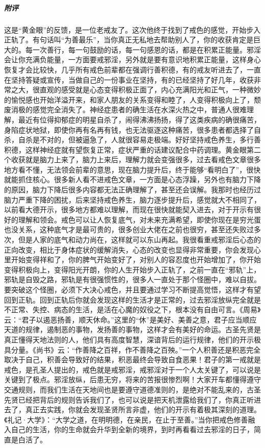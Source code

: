 \begin{case}
    \subparagraph{附评} 这是“黄金眼”的反馈，是一位老戒友了。这次他终于找到了戒色的感觉，开始步入正轨了。有句话叫“为善最乐”，当你真正无私地去帮助别人了，你的收获肯定是巨大的。每一次善行，每一句鼓励的话，每一句感恩的话，都是在积累正能量。邪淫会让你充满负能量，一方面要戒邪淫，另外就是要有意识地积累正能量，这样身心恢复才会比较快，几乎所有戒色前辈都在强调行善积德，有的戒友听进去了，一直在坚持答疑或宣传，当做自己的一份事业在坚持，有的已经坚持了好几年，收获非常之大，很直观的感受就是心态变得积极正面了，内心充满阳光和正气，一种微妙的愉悦感也开始洋溢开来，和家人朋友的关系变得和睦了，人变得积极向上了，颓废消极的感觉完全消失了。神经症患者的确生活在水深火热之中，普通人很难理解，最近有位得抑郁症的明星自杀了，闹得沸沸扬扬，得了这类疾病的确很痛苦，身陷症状地狱，即使你再有名再有钱，也无法驱逐这种痛苦，很多患者都选择了自杀，自杀是不对的，但被逼急了，人就很容易走极端。好好坚持戒色养生，多行善积德，这样神经症就有望恢复正常，症状严重的话建议配合中药调理。黄金眼第二个收获就是脑力上来了，脑力上来后，理解力就会变强很多，过去看戒色文章很多地方看不懂，无法领会前辈的意思，现在脑力提升后，终于能够“看明白了”，很快就能抓住核心。很多新人看不进戒色文章，一方面是心态浮躁，另外也有脑力下降的原因，脑力下降后很多内容都无法正确理解了，甚至还会误解。我那时也经历过脑力严重下降的困扰，后来坚持戒色养生，脑力逐步提升后，感觉就大不相同了，以前看大德开示，很多地方都难以理解，而现在很快就能契入进去，对于开示有很好的理解和领会。戒色可以让人恢复底气，对未来充满希望，即使你现在是穷光蛋也没关系，这种底气才是最可贵的，很多创业大佬在之前也很穷，甚至还失败过多次，但是人家的底气和动力尚在，这样就可以东山再起。我很看重戒邪淫后心态的正向改变，相比于身体症状的缓解消失，心态的改变也显得非常重要，你会发现心里开始变得祥和了，你的脾气开始变好了，对别人的容忍度也开始增加了，你开始变得积极向上，变得阳光开朗，你的人生开始步入正轨了，之前一直在“邪轨”上，邪轨是自毁之路，邪轨是有很强惯性的，很多人一直处于那个怪圈中，难以自拔。要突破这个怪圈，必须下大决心戒色，并且要通过学习不断提高觉悟，这样才有望回到正轨。回到正轨后你就会发现这样的生活才是正常的，过去邪淫放纵完全就是不正常、失控、病态的生活，是活在心魔的奴役之下，根本没有自由可言。《周易》云：“君子以遏恶扬善，顺天休命。”这里的“休”是美好、美善之意，君子应当顺应天道的规律，遏制恶的事物，发扬善的事物，这样才会有美好的命运。古圣先贤是真正懂得天地法则的人，他们具有高度智慧，深谙背后的运行规律，他们的开示极具分量。《尚书》云：“作善降之百祥，作不善降之百殃。”一个人积善还是积恶完全取决于自己，积善会导致好的结果，积恶最终会导致自食恶果！君子的第一戒就是戒色，是孔圣人提出的，戒色就是戒邪淫，戒邪淫对于一个人太关键了，可以说是关键到了极点。邪淫放纵，后患无穷，将来的苦报很惨烈啊！大家开车都懂得遵守交通规则，而我们生活在天地间也是要遵守道德准则的，是绝对不能乱来的，古圣先贤已经把背后的规则告诉我们了，也可以说是把天机泄露给我们了，你真正听进去了，真正去实践，你就会发现圣贤所言非虚，他们的开示有着极其深刻的道理。《礼记·大学》：“大学之道，在明明德，在亲民，在止于至善。”当你把戒色修善融入自己的生活，你的生命就会升华到全新的境界，到时再看看过去邪淫的日子，简直是白活了。
\end{case}

